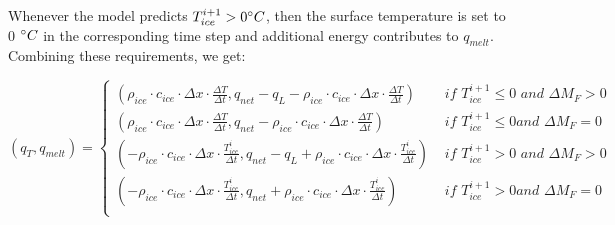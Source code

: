 \documentclass[utf8]{frontiersSCNS} %
\begin{document}
Whenever the model predicts $T_{ice}^{i+1} > 0 \degree C$, then the surface
temperature is set to 0 $\degree C$ in the corresponding time step and
additional energy contributes to $q_{melt}$. Combining these requirements, we
get:

\begin{equation} 
  (q_{T}, q_{melt}) = \left\{
    \begin{array}{ll} ( \rho_{ice}
    \cdot c_{ice} \cdot  \Delta x \cdot \frac{\Delta T}{\Delta t},
    q_{net}-q_{L}-\rho_{ice} \cdot c_{ice} \cdot  \Delta x \cdot \frac{\Delta
    T}{\Delta t}) & \textit{ if } T_{ice}^{i+1}\leq 0 \textit{ and } \Delta
    M_{F} > 0\\ ( \rho_{ice} \cdot c_{ice} \cdot  \Delta x \cdot \frac{\Delta
  T}{\Delta t}, q_{net}-\rho_{ice} \cdot c_{ice} \cdot  \Delta x \cdot
    \frac{\Delta T}{\Delta t}) & \textit{ if } T_{ice}^{i+1}\leq 0 \textit{
    and } \Delta M_{F} = 0\\
        ( -\rho_{ice} \cdot c_{ice} \cdot  \Delta x \cdot
    \frac{T_{ice}^{i}}{\Delta t}, q_{net}-q_{L}+\rho_{ice} \cdot c_{ice} \cdot
    \Delta x \cdot \frac{T_{ice}^{i}}{\Delta t}) & \textit{ if }
    T_{ice}^{i+1}> 0 \textit{ and } \Delta M_{F} > 0\\ ( -\rho_{ice} \cdot
    c_{ice} \cdot  \Delta x \cdot \frac{T_{ice}^{i}}{\Delta t},
    q_{net}+\rho_{ice} \cdot c_{ice} \cdot  \Delta x \cdot
    \frac{T_{ice}^{i}}{\Delta t}) & \textit{ if } T_{ice}^{i+1}> 0 \textit{
    and } \Delta M_{F} = 0\\ 
\end{array} 
\right.
\label{eqn:qt}
\end{equation}
\end{document}
